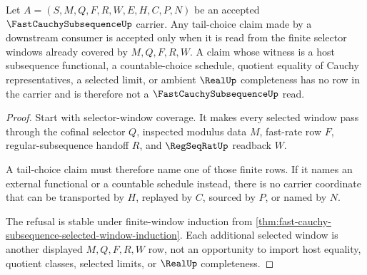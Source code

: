 \begin{theorem}
\label{thm:fast-cauchy-subsequence-tail-choice-refusal}
Let $A=(S,M,Q,F,R,W,E,H,C,P,N)$ be an accepted $\FastCauchySubsequenceUp$ carrier. Any tail-choice claim made by a downstream consumer is accepted only when it is read from the finite selector windows already covered by $M,Q,F,R,W$. A claim whose witness is a host subsequence functional, a countable-choice schedule, quotient equality of Cauchy representatives, a selected limit, or ambient $\RealUp$ completeness has no row in the carrier and is therefore not a $\FastCauchySubsequenceUp$ read.
\end{theorem}
\begin{proof}
Start with selector-window coverage. It makes every selected window pass through the cofinal selector $Q$, inspected modulus data $M$, fast-rate row $F$, regular-subsequence handoff $R$, and $\RegSeqRatUp$ readback $W$.

A tail-choice claim must therefore name one of those finite rows. If it names an external functional or a countable schedule instead, there is no carrier coordinate that can be transported by $H$, replayed by $C$, sourced by $P$, or named by $N$.

The refusal is stable under finite-window induction from \autoref{thm:fast-cauchy-subsequence-selected-window-induction}. Each additional selected window is another displayed $M,Q,F,R,W$ row, not an opportunity to import host equality, quotient classes, selected limits, or $\RealUp$ completeness.
\end{proof}

